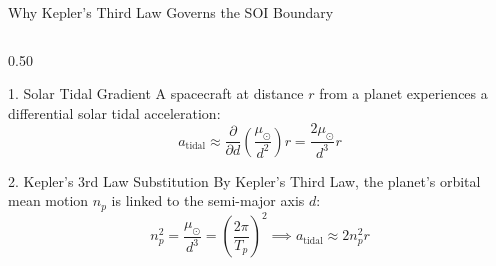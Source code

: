 \documentclass[aspectratio=169, 10pt]{beamer}
\begin{document}
\begin{frame}{Why Kepler's Third Law Governs the SOI Boundary}
    \begin{columns}[t]
        \begin{column}{0.50\textwidth}
            \begin{block}{1. Solar Tidal Gradient}
                \scriptsize
                A spacecraft at distance $r$ from a planet experiences a differential solar tidal acceleration:
                \vspace{-0.1cm}
                \begin{equation*}
                    a_{\text{tidal}} \approx \frac{\partial}{\partial d}\left(\frac{\mu_\odot}{d^2}\right) r = \frac{2\mu_\odot}{d^3} r
                \end{equation*}
            \end{block}
            \vspace{-0.1cm}
            \begin{block}{2. Kepler's 3rd Law Substitution}
                \scriptsize
                By Kepler's Third Law, the planet's orbital mean motion $n_p$ is linked to the semi-major axis $d$:
                \vspace{-0.1cm}
                \begin{equation*}
                    n_p^2 = \frac{\mu_\odot}{d^3} = \left(\frac{2\pi}{T_p}\right)^2 \implies a_{\text{tidal}} \approx 2 n_p^2 r
                \end{equation*}
            \end{block}
        \end{column}


\end{columns}
\end{frame}
\end{document}
